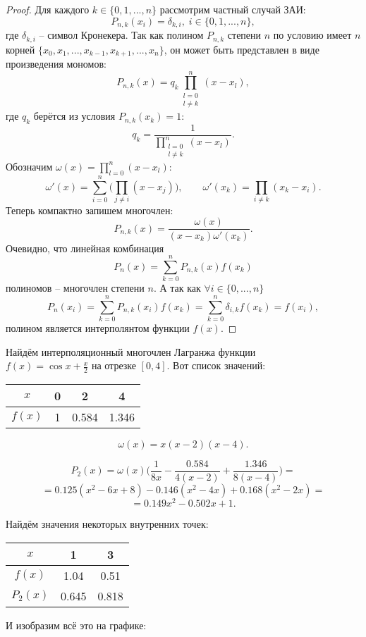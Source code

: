 \documentclass[../main.tex]{subfile}
\begin{document}
\begin{proof}
	Для каждого $k\in\{0,1,...,n\}$ рассмотрим частный случай ЗАИ:
	\[P_{n,k}(x_i)=\delta_{k,i},\;i\in\{0,1,...,n\},\]
	где $\delta_{k,i}$ -- символ Кронекера. Так как полином $P_{n,k}$
	степени $n$ по условию имеет $n$ корней $\{x_0, x_1, ..., x_{k-1},
	x_{k+1}, ..., x_n\}$, он может быть представлен в виде произведения
	мономов:
	\[P_{n,k}(x)=q_k\prod_{\substack{l=0\\ l\neq k}}^{n}(x-x_l),\]
	где $q_k$ берётся из условия $P_{n,k}(x_k)=1$:
	\[q_k=\frac{1}{\prod_{\substack{l=0\\ l\neq k}}^{n}(x-x_l)}.\]
	Обозначим $\omega(x)=\prod_{l=0}^{n}(x-x_l)$:
	\[\omega'(x)=\sum_{i=0}^n\Big(\prod_{j\ne i}(x-x_j)\Big),\qquad
	\omega'(x_k)=\prod_{i\ne k}(x_k-x_i).\]
	Теперь компактно запишем многочлен:
	\[P_{n,k}(x)=\frac{\omega(x)}{(x-x_k)\omega'(x_k)}.\]
	Очевидно, что линейная комбинация
	\[P_n(x)=\sum_{k=0}^{n}P_{n,k}(x)f(x_k)\]
	полиномов -- многочлен степени $n$. А так как $\forall i\in\{0,...,n\}$
	\[P_n(x_i)=\sum_{k=0}^{n}P_{n,k}(x_i)f(x_k)=\sum_{k=0}^{n}\delta_{i,k}
	f(x_k)=f(x_i),\]
	полином является интерполянтом функции $f(x)$.
\end{proof}

\begin{example}\label{eq:lagrange_polynomial_example}
	Найдём интерполяционный многочлен Лагранжа функции \\ $f(x)=\cos x +
	\frac{x}{2}$ на отрезке $[0,4]$. Вот список значений:\newline

	\begin{tabular}{*{4}{|c}|}
		\hline
		$x$	& 0	& 2	& 4	\\
		\hline
		$f(x)$	& 1	& 0.584	& 1.346	\\
		\hline
	\end{tabular}

	\[\omega(x)=x(x-2)(x-4).\]

	\[P_2(x)=\omega(x)\Big (\frac{1}{8x}-\frac{0.584}{4(x-2)}
	+\frac{1.346}{8(x-4)} \Big )=\]
	\[=0.125(x^2-6x+8)-0.146(x^2-4x)+0.168(x^2-2x)=\]
	\[=0.149x^2-0.502x+1.\]
	\newpage

	Найдём значения некоторых внутренних точек:\newline

	\begin{tabular}{*{3}{|c}|}
		\hline
		$x$     & 1     & 3     \\
		\hline
		$f(x)$  & 1.04	& 0.51	\\
		\hline
		$P_2(x)$& 0.645	& 0.818	\\
		\hline
	\end{tabular}
	\leavevmode\newline

	И изобразим всё это на графике:
	\newline

	

\end{example}
\end{document}
